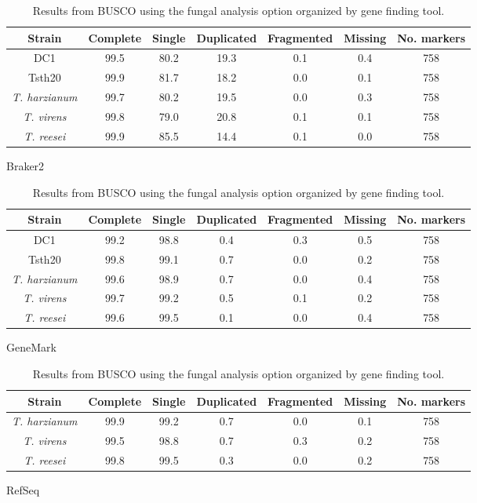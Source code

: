 \begin{table}
  \begin{center}
    \begin{subtable}{\textwidth}
      \centering
      \begin{tabular}{|c|c|c|c|c|c|c|}
        \hline
        Strain & Complete & Single & Duplicated & Fragmented & Missing & No. markers \\ \hline
        DC1 & 99.5 & 80.2 & 19.3 & 0.1 & 0.4 & 758 \\ \hline
        Tsth20 & 99.9 & 81.7 & 18.2 & 0.0 & 0.1 & 758 \\ \hline
        \textit{T. harzianum} & 99.7 & 80.2 & 19.5 & 0.0 & 0.3 & 758 \\ \hline
        \textit{T. virens} & 99.8 & 79.0 & 20.8 & 0.1 & 0.1 & 758 \\ \hline
        \textit{T. reesei} & 99.9 & 85.5 & 14.4 & 0.1 & 0.0 & 758 \\ \hline
      \end{tabular}
      \caption{Braker2}
    \end{subtable}
    \begin{subtable}{\textwidth}
      \centering
      \begin{tabular}{|c|c|c|c|c|c|c|}
        \hline
        Strain & Complete & Single & Duplicated & Fragmented & Missing & No. markers \\ \hline
        DC1 & 99.2 & 98.8 & 0.4 & 0.3 & 0.5 & 758 \\ \hline
        Tsth20 & 99.8 & 99.1 & 0.7 & 0.0 & 0.2 & 758 \\ \hline
        \textit{T. harzianum} & 99.6 & 98.9 & 0.7 & 0.0 & 0.4 & 758 \\ \hline
        \textit{T. virens} & 99.7 & 99.2 & 0.5 & 0.1 & 0.2 & 758 \\ \hline
        \textit{T. reesei} & 99.6 & 99.5 & 0.1 & 0.0 & 0.4 & 758 \\ \hline
      \end{tabular}
      \caption{GeneMark}
    \end{subtable}
    \begin{subtable}{\textwidth}
      \centering
      \begin{tabular}{|c|c|c|c|c|c|c|}
        \hline
        Strain & Complete & Single & Duplicated & Fragmented & Missing & No. markers \\ \hline
        \textit{T. harzianum} & 99.9 & 99.2 & 0.7 & 0.0 & 0.1 & 758 \\ \hline
        \textit{T. virens} & 99.5 & 98.8 & 0.7 & 0.3 & 0.2 & 758 \\ \hline
        \textit{T. reesei} & 99.8 & 99.5 & 0.3 & 0.0 & 0.2 & 758 \\ \hline
      \end{tabular}
      \caption{RefSeq}
    \end{subtable}
  \end{center}
  \caption{Results from BUSCO using the fungal analysis option organized by gene finding tool.}
  \label{table:busco}
\end{table}

